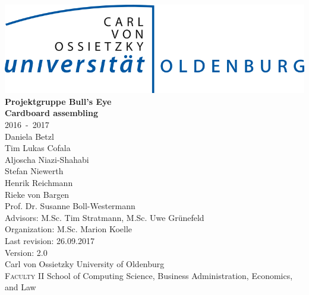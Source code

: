 \documentclass[12pt,a4paper,twoside]{scrreprt}
\begin{document}
\pagestyle{plain}

\begin{titlepage}

		\begin{center}
		\includegraphics[scale=0.3]{LogoUniOL.png}\\[3cm]
		\Huge{\textbf{Projektgruppe Bull's Eye}}\\[0.4cm]
		\huge{\textbf{Cardboard assembling}}\\[0.5cm]
		\Large{2016~-~2017}\\[3ex]
		\large{
		Daniela Betzl\\
		Tim Lukas Cofala\\
		Aljoscha Niazi-Shahabi\\
		Stefan Niewerth\\
		Henrik Reichmann\\
		Rieke von Bargen\\
		}
		\vspace{1.5cm}
		\large{
				Prof. Dr. Susanne Boll-Westermann\\
				Advisors: M.Sc. Tim Stratmann, M.Sc. Uwe Gr\"unefeld\\
				Organization: M.Sc. Marion Koelle \\
				Last revision: 26.09.2017\\
				Version: 2.0\\
				Carl von Ossietzky University of Oldenburg\\
				\textsc{Faculty II } School of Computing Science, Business Administration, Economics, and Law 
			}
		\end{center}
\end{titlepage}

\listoftodos

%
\end{document}
